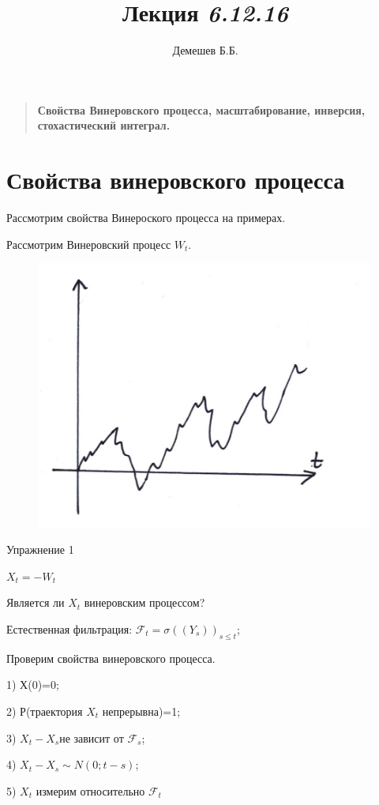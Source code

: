 \documentclass{article}
\title{Лекция {\it 6.12.16\/}}
\author
{Демешев Б.Б.}
\date{}
\newenvironment{sciabstract}{%
\begin{quote} \bf}
{\end{quote}}
\begin{document}

\baselineskip12pt

\maketitle



\begin{sciabstract}
  Свойства Винеровского процесса, масштабирование, инверсия, стохастический интеграл.
\end{sciabstract}


\section*{Свойства винеровского процесса}

Рассмотрим свойства Винероского процесса на примерах.

Рассмотрим Винеровский процесс $W_t$.

\begin{figure}[h!]
\includegraphics[width=0.5\linewidth]{04_lecture}
\end{figure}


Упражнение 1

\parindent=1cm

$X_t= - W_t$

Является ли $X_t$ винеровским процессом?

Естественная фильтрация: $\mathcal{F}_t=\sigma((Y_s))_{s\le t}$;

Проверим свойства винеровского процесса.

1) Х(0)=0;

2) Р(траектория $X_t$ непрерывна)=1;

3) $X_t-X_s$не зависит от $\mathcal{F}_s$;

4) $X_t-X_s \sim N(0;t-s)$;

5) $X_t$ измерим относительно  $\mathcal{F}_t$
\end{document}
